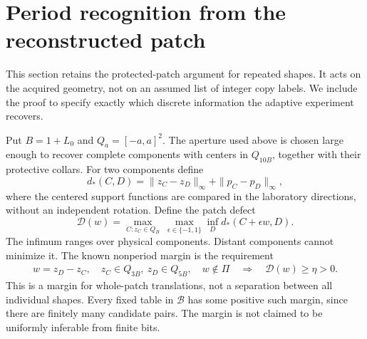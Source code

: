\section{Period recognition from the reconstructed patch}
\label{sec:periods}
This section retains the protected-patch argument for repeated shapes.
It acts on the acquired geometry, not on an assumed list of integer
copy labels. We include the proof to specify exactly which discrete
information the adaptive experiment recovers.

Put $B=1+L_0$ and $Q_a=[-a,a]^2$. The aperture used above is chosen
large enough to recover complete components with centers in $Q_{10B}$,
together with their protective collars. For two components define
\[
 d_*(C,D)=\|z_C-z_D\|_\infty+\|p_C-p_D\|_\infty,
\]
where the centered support functions are compared in the laboratory
directions, without an independent rotation. Define the patch defect
\begin{equation}\label{eq:defect}
 \mathcal D(w)=\max_{C:z_C\in Q_B}\ \max_{\epsilon\in\{-1,1\}}
                     \inf_D d_*(C+\epsilon w,D).
\end{equation}
The infimum ranges over physical components. Distant components cannot
minimize it. The known nonperiod margin is the requirement
\begin{equation}\label{eq:patch-margin}
 \begin{gathered}
 w=z_D-z_C,\quad z_C\in Q_{3B},\ z_D\in Q_{5B},\quad w\notin\Pi
       \quad\Longrightarrow\quad\mathcal D(w)\ge\eta>0.
 \end{gathered}
\end{equation}
This is a margin for whole-patch translations, not a separation between
all individual shapes. Every fixed table in $\mathcal B$ has some
positive such margin, since there are finitely many candidate pairs.
The margin is not claimed to be uniformly inferable from finite bits.

